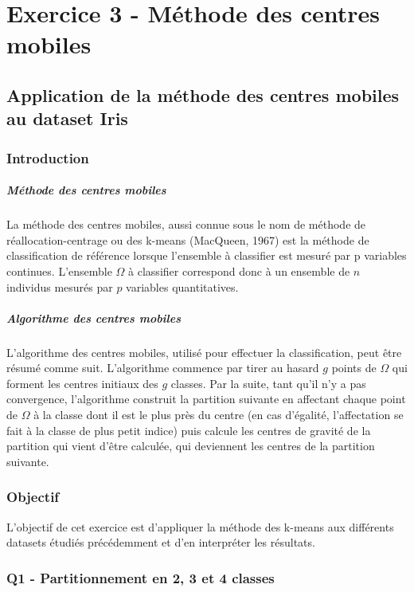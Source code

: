 \documentclass{report}
\begin{document}
\chapter{Exercice 3 - Méthode des centres mobiles}
\section{Application de la méthode des centres mobiles au dataset Iris}
\subsection{Introduction}
\paragraph{Méthode des centres mobiles}
La méthode des centres mobiles, aussi connue sous le nom de méthode de réallocation-centrage ou des k-means (MacQueen, 1967) est la méthode de classification de référence lorsque l'ensemble à classifier est mesuré par p variables continues. L'ensemble $\Omega$ à classifier correspond donc à un ensemble de $n$ individus mesurés par $p$ variables quantitatives.
\paragraph{Algorithme des centres mobiles}
L'algorithme des centres mobiles, utilisé pour effectuer la classification, peut être résumé comme suit. L'algorithme commence par tirer au hasard $g$ points de $\Omega$ qui forment les centres initiaux des $g$ classes. Par la suite, tant qu'il n'y a pas convergence, l'algorithme construit la partition suivante en affectant chaque point de $\Omega$ à la classe dont il est le plus près du centre (en cas d'égalité, l'affectation se fait à la classe de plus petit indice) puis calcule les centres de gravité de la partition qui vient d'être calculée, qui deviennent les centres de la partition suivante.
\subsection{Objectif}
L'objectif de cet exercice est d'appliquer la méthode des k-means aux différents datasets étudiés précédemment et d'en interpréter les résultats.
\subsection{Q1 - Partitionnement en 2, 3 et 4 classes}
\end{document}
